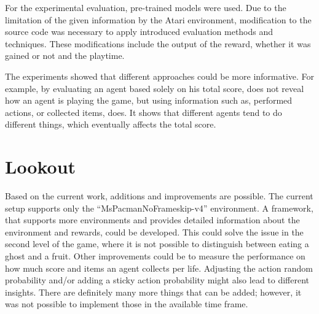 For the experimental evaluation, pre-trained models were used. Due to the limitation of the given information by the Atari environment, modification to the source code was necessary to apply introduced evaluation methods and techniques. These modifications include the output of the reward, whether it was gained or not and the playtime. 

The experiments showed that different approaches could be more informative. For example, by evaluating an agent based solely on his total score, does not reveal how an agent is playing the game, but using information such as, performed actions, or collected items, does. It shows that different agents tend to do different things, which eventually affects the total score. 

\section{Lookout}
Based on the current work, additions and improvements are possible. The current setup supports only the ``MsPacmanNoFrameskip-v4'' environment. A framework, that supports more environments and provides detailed information about the environment and rewards, could be developed. This could solve the issue in the second level of the game, where it is not possible to distinguish between eating a ghost and a fruit. Other improvements could be to measure the performance on how much score and items an agent collects per life. Adjusting the action random probability and/or adding a sticky action probability might also lead to different insights. There are definitely many more things that can be added; however, it was not possible to implement those in the available time frame.





